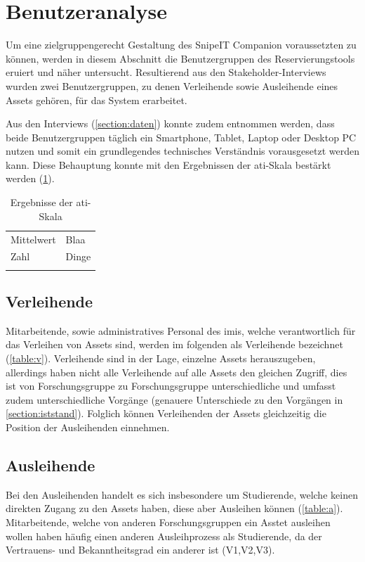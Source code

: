 \section{Benutzeranalyse}
\label{section:benutzer}
Um eine zielgruppengerecht Gestaltung des SnipeIT Companion voraussetzten zu
können, werden in diesem Abschnitt die Benutzergruppen des Reservierungstools
eruiert und näher untersucht. Resultierend aus den Stakeholder-Interviews wurden
zwei Benutzergruppen, zu denen Verleihende sowie Ausleihende eines Assets
gehören, für das System erarbeitet.

Aus den Interviews (\ref{section:daten}) konnte zudem entnommen werden, dass
beide Benutzergruppen täglich ein Smartphone, Tablet, Laptop oder Desktop PC
nutzen und somit ein grundlegendes technisches Verständnis vorausgesetzt werden
kann. Diese Behauptung konnte mit den Ergebnissen der \ac{ati}-Skala bestärkt
werden (\ref{table:ati}).

\begin{table}[h]
        \centering
        \caption{Ergebnisse der \ac{ati}-Skala}
        \begin{tabular}{ll}
                \arrayrulecolor{maincolor}\hline
                \sffamily\color{maincolor}Mittelwert &
                \sffamily\color{maincolor}Blaa               \\
                \arrayrulecolor{maincolor}\hline
                Zahl                                 & Dinge
                \\
                \arrayrulecolor{maincolor}\hline
        \end{tabular}
        \label{table:ati}
\end{table}


\subsection*{Verleihende}
Mitarbeitende, sowie administratives Personal des \ac{imis}, welche
verantwortlich für das Verleihen von Assets sind, werden im folgenden als
Verleihende bezeichnet (\ref{table:v}). Verleihende sind in der Lage, einzelne
Assets herauszugeben, allerdings haben nicht alle Verleihende auf alle Assets
den gleichen Zugriff, dies ist von Forschungsgruppe zu Forschungsgruppe
unterschiedliche und umfasst zudem unterschiedliche Vorgänge (genauere
Unterschiede zu den Vorgängen in \ref{section:iststand}). Folglich können
Verleihenden der Assets gleichzeitig die Position der Ausleihenden einnehmen.

\subsection*{Ausleihende}
Bei den Ausleihenden handelt es sich insbesondere um Studierende, welche keinen
direkten Zugang zu den Assets haben, diese aber Ausleihen können
(\ref{table:a}). Mitarbeitende, welche von anderen Forschungsgruppen ein Asstet
ausleihen wollen haben häufig einen anderen Ausleihprozess als Studierende, da
der Vertrauens- und Bekanntheitsgrad ein anderer ist (V1,V2,V3).


